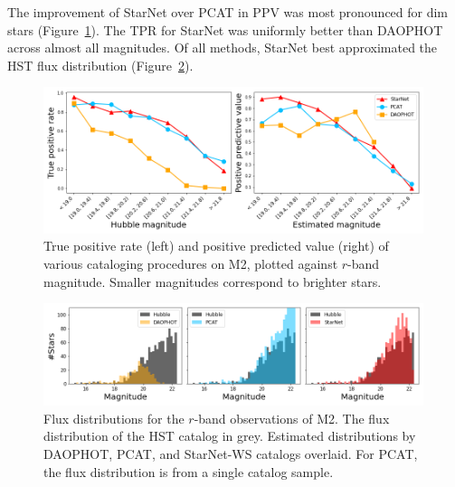 

The improvement of StarNet over PCAT in PPV was most pronounced for dim stars (Figure~\ref{fig:summary_stats}).
The TPR for StarNet was uniformly better than DAOPHOT across almost all magnitudes.
Of all methods, StarNet best approximated the HST flux distribution (Figure~\ref{fig:luminosity_fun_m2}).


\begin{figure}[tb]
    \centering
    \includegraphics[width=0.99\textwidth]{figures/m2_results/summary_statistics_m2.png}
    \vspace{-0.4cm}
    \caption{True positive rate (left) and positive predicted value (right) of various cataloging
    procedures on M2, plotted against $r$-band magnitude.
    Smaller magnitudes correspond to brighter stars.
    }
    \label{fig:summary_stats}
\end{figure}


\begin{figure}[tb]
    \centering
    \includegraphics[width=0.99\textwidth]{figures/m2_results/luminosity_fun.png}
    \vspace{-0.4cm}
    \caption{Flux distributions for the $r$-band observations of M2.
    The flux distribution of the HST catalog in grey.
    Estimated distributions by DAOPHOT, PCAT, and StarNet-WS catalogs overlaid.
    For PCAT, the flux distribution is from a single catalog sample. }
    \label{fig:luminosity_fun_m2}
\end{figure}


